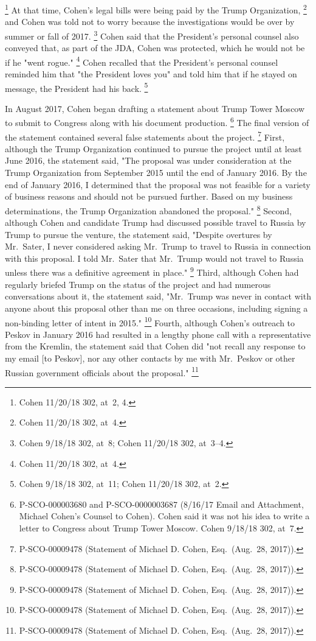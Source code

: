 {\footnote{Cohen 11/20/18 302, at~2, 4.}
At that time, Cohen's legal bills were being paid by the Trump Organization,%
\footnote{Cohen 11/20/18 302, at~4.}
and Cohen was told not to worry because the investigations would be over by summer or fall of 2017.%
\footnote{Cohen 9/18/18 302, at~8;
Cohen 11/20/18 302, at~3--4.}
Cohen said that the President's personal counsel also conveyed that, as part of the JDA, Cohen was protected, which he would not be if he "went rogue."%
\footnote{Cohen 11/20/18 302, at~4.}
Cohen recalled that the President's personal counsel reminded him that "the President loves you" and told him that if he stayed on message, the President had his back.%
\footnote{Cohen 9/18/18 302, at~11;
Cohen 11/20/18 302, at~2.}

In August 2017, Cohen began drafting a statement about Trump Tower Moscow to submit to Congress along with his document production.%
\footnote{P-SCO-000003680 and P-SCO-0000003687 (8/16/17 Email and Attachment, Michael Cohen's Counsel to Cohen).
Cohen said it was not his idea to write a letter to Congress about Trump Tower Moscow.
Cohen 9/18/18 302, at~7.}
The final version of the statement contained several false statements about the project.%
\footnote{P-SCO-00009478 (Statement of Michael D. Cohen, Esq.\ (Aug.~28, 2017)).}
First, although the Trump Organization continued to pursue the project until at least June 2016, the statement said, "The proposal was under consideration at the Trump Organization from September 2015 until the end of January 2016.
By the end of January 2016, I determined that the proposal was not feasible for a variety of business reasons and should not be pursued further.
Based on my business determinations, the Trump Organization abandoned the proposal."%
\footnote{P-SCO-00009478 (Statement of Michael D. Cohen, Esq.\ (Aug.~28, 2017)).}
Second, although Cohen and candidate Trump had discussed possible travel to Russia by Trump to pursue the venture, the statement said, "Despite overtures by Mr.~Sater, I never considered asking Mr.~Trump to travel to Russia in connection with this proposal.
I told Mr.~Sater that Mr.~Trump would not travel to Russia unless there was a definitive agreement in place."%
\footnote{P-SCO-00009478 (Statement of Michael D. Cohen, Esq.\ (Aug.~28, 2017)).}
Third, although Cohen had regularly briefed Trump on the status of the project and had numerous conversations about it, the statement said, "Mr.~Trump was never in contact with anyone about this proposal other than me on three occasions, including signing a non-binding letter of intent in 2015."%
\footnote{P-SCO-00009478 (Statement of Michael D. Cohen, Esq.\ (Aug.~28, 2017)).}
Fourth, although Cohen's outreach to Peskov in January 2016 had resulted in a lengthy phone call with a representative from the Kremlin, the statement said that Cohen did "not recall any response to my email [to Peskov], nor any other contacts by me with Mr.~Peskov or other Russian government officials about the proposal."%
\footnote{P-SCO-00009478 (Statement of Michael D. Cohen, Esq.\ (Aug.~28, 2017)).}

}
